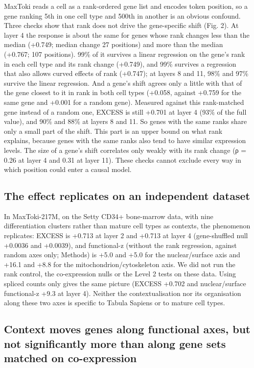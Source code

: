 \documentclass[
  11pt,
]{article}
\begin{document}
MaxToki reads a cell as a rank-ordered gene list and encodes token
position, so a gene ranking 5th in one cell type and 500th in another is
an obvious confound. Three checks show that rank does not drive the
gene-specific shift (Fig. 2). At layer 4 the response is about the same
for genes whose rank changes less than the median (+0.749; median change
27 positions) and more than the median (+0.767; 107 positions). 99\% of
it survives a linear regression on the gene's rank in each cell type and
its rank change (+0.749), and 99\% survives a regression that also
allows curved effects of rank (+0.747); at layers 8 and 11, 98\% and
97\% survive the linear regression. And a gene's shift agrees only a
little with that of the gene closest to it in rank in both cell types
(+0.058, against +0.759 for the same gene and +0.001 for a random gene).
Measured against this rank-matched gene instead of a random one, EXCESS
is still +0.701 at layer 4 (93\% of the full value), and 90\% and 88\%
at layers 8 and 11. So genes with the same ranks share only a small part
of the shift. This part is an upper bound on what rank explains, because
genes with the same ranks also tend to have similar expression levels.
The size of a gene's shift correlates only weakly with its rank change
(ρ = 0.26 at layer 4 and 0.31 at layer 11). These checks cannot exclude
every way in which position could enter a causal model.

\subsection{The effect replicates on an independent
dataset}\label{the-effect-replicates-on-an-independent-dataset}

In MaxToki-217M, on the Setty CD34+ bone-marrow data, with nine
differentiation clusters rather than mature cell types as contexts, the
phenomenon replicates: EXCESS is +0.713 at layer 2 and +0.713 at layer 4
(gene-shuffled null +0.0036 and +0.0039), and functional-z (without the
rank regression, against random axes only; Methods) is +5.0 and +5.0 for
the nuclear/surface axis and +16.1 and +8.8 for the
mitochondrion/cytoskeleton axis. We did not run the rank control, the
co-expression nulls or the Level 2 tests on these data. Using spliced
counts only gives the same picture (EXCESS +0.702 and nuclear/surface
functional-z +9.3 at layer 4). Neither the contextualisation nor its
organisation along these two axes is specific to Tabula Sapiens or to
mature cell types.

\subsection{Context moves genes along functional axes, but not
significantly more than along gene sets matched on
co-expression}\label{context-moves-genes-along-functional-axes-but-not-significantly-more-than-along-gene-sets-matched-on-co-expression}
\end{document}
